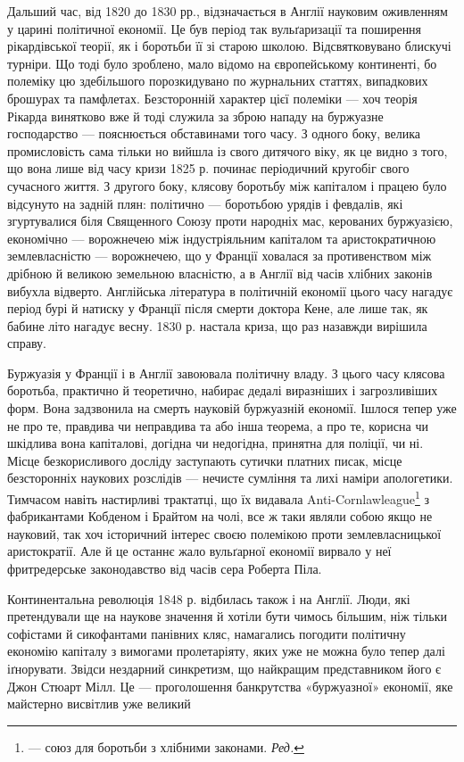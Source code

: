 Дальший час, від 1820 до 1830 рр., відзначається в Англії науковим
оживленням у царині політичної економії. Це був період
так вульґаризації та поширення рікардівської теорії, як і боротьби
її зі старою школою. Відсвятковувано блискучі турніри.
Що тоді було зроблено, мало відомо на європейському континенті,
бо полеміку цю здебільшого порозкидувано по журнальних
статтях, випадкових брошурах та памфлетах. Безсторонній характер
цієї полеміки — хоч теорія Рікарда винятково вже й тоді
служила за зброю нападу на буржуазне господарство — пояснюється
обставинами того часу. З одного боку, велика промисловість
сама тільки но вийшла із свого дитячого віку, як це видно з того,
що вона лише від часу кризи 1825 р. починає періодичний кругобіг
свого сучасного життя. З другого боку, клясову боротьбу між
капіталом і працею було відсунуто на задній плян: політично —
боротьбою урядів і февдалів, які згуртувалися біля Священного
Союзу проти народніх мас, керованих буржуазією, економічно —
ворожнечею між індустріяльним капіталом та аристократичною
землевласністю — ворожнечею, що у Франції ховалася за противенством
між дрібною й великою земельною власністю, а в Англії
від часів хлібних законів вибухла відверто. Англійська література
в політичній економії цього часу нагадує період бурі й натиску
у Франції після смерти доктора Кене, але лише так, як
бабине літо нагадує весну. 1830 р. настала криза, що раз назавжди
вирішила справу.

Буржуазія у Франції і в Англії завоювала політичну владу.
З цього часу клясова боротьба, практично й теоретично, набирає
дедалі виразніших і загрозливіших форм. Вона задзвонила
на смерть науковій буржуазній економії. Ішлося тепер уже
не про те, правдива чи неправдива та або інша теорема, а про те,
корисна чи шкідлива вона капіталові, догідна чи недогідна, принятна
для поліції, чи ні. Місце безкорисливого досліду заступають
сутички платних писак, місце безсторонніх наукових розслідів —
нечисте сумління та лихі наміри апологетики. Тимчасом навіть
настирливі трактатці, що їх видавала Anti-Cornlawleague\footnote*{
— союз для боротьби з хлібними законами. \emph{Ред.}
} з
фабрикантами Кобденом і Брайтом на чолі, все ж таки являли
собою якщо не науковий, так хоч історичний інтерес своєю полемікою
проти землевласницької аристократії. Але й це останнє
жало вульґарної економії вирвало у неї фритредерське законодавство
від часів сера Роберта Піла.

Континентальна революція 1848 р. відбилась також і на Англії.
Люди, які претендували ще на наукове значення й хотіли бути
чимось більшим, ніж тільки софістами й сикофантами панівних
кляс, намагались погодити політичну економію капіталу з вимогами
пролетаріяту, яких уже не можна було тепер далі іґнорувати.
Звідси нездарний синкретизм, що найкращим представником
його є Джон Стюарт Мілл. Це — проголошення банкрутства
«буржуазної» економії, яке майстерно висвітлив уже великий
\parbreak{}  %
